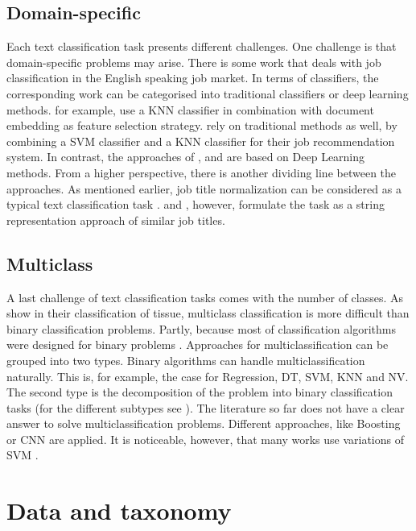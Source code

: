 \documentclass[12pt, a4paper, titlepage]{article}
\begin{document}
\subsection{Domain-specific}
Each text classification task presents different challenges. One challenge is that domain-specific problems may arise. There is some work that deals with job classification in the English speaking job market. 
In terms of classifiers, the corresponding work can be categorised into traditional classifiers or deep learning methods. \cite{Zhu2017} for example, use a KNN classifier in combination with document embedding as feature selection strategy. \cite{Javed2015} rely on traditional methods as well, by combining a SVM classifier and a KNN classifier for their job recommendation system. In contrast, the approaches of \cite{Decorte2021}, \cite{WangJ2019} and \cite{Neculoiu2016} are based on Deep Learning methods. From a higher perspective, there is another dividing line between the approaches. As mentioned earlier, job title normalization can be considered as a typical text classification task \citep{WangJ2019, Javed2015, Zhu2017}. \cite{Decorte2021} and \cite{Neculoiu2016}, however, formulate the task as a string representation approach of similar job titles.  

\subsection{Multiclass}
A last challenge of text classification tasks comes with the number of classes. As \cite{Li2004} show in their classification of tissue, multiclass classification is more difficult than binary classification problems. Partly, because most of classification algorithms were designed for binary problems \citep{Aly2005}. Approaches for multiclassification can be grouped into two types. Binary algorithms can handle multiclassification naturally. This is, for example, the case for Regression, DT, SVM, KNN and NV. The second type is the decomposition of the problem into binary classification tasks (for the different subtypes see \cite{Aly2005}). The literature so far does not have a clear answer to solve multiclassification problems. Different approaches, like Boosting \citep{Schapire2000} or CNN \citep{Farooq2017} are applied. It is noticeable, however, that many works use variations of SVM \citep{Guo2015,Tomar2015,Tang2019}. 

\section{Data and taxonomy}
\end{document}
